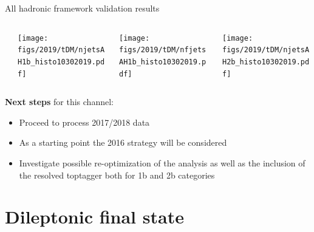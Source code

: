\documentclass[9pt]{beamer}
\begin{document}
\begin{frame}{\alert{All hadronic} framework validation results}
\begin{columns}
\begin{column}{0.05\textwidth}
		\end{column} \hfill
		\begin{column}{0.32\textwidth}
			\begin{center}
     			\texttt{[image: figs/2019/tDM/njetsAH1b\_histo10302019.pdf]}
    		\end{center}		
		\end{column} \hfill
		\begin{column}{0.32\textwidth}
			\begin{center}
     			\texttt{[image: figs/2019/tDM/nfjetsAH1b\_histo10302019.pdf]}
    		\end{center}		
		\end{column} \hfill
		\begin{column}{0.32\textwidth}
			\begin{center}
     			\texttt{[image: figs/2019/tDM/njetsAH2b\_histo10302019.pdf]}
   			 \end{center}
		\end{column} \hfill
	\end{columns} \vfill
	\textbf{Next steps} for this channel:
\begin{itemize}
\item Proceed to process 2017/2018 data
\item As a starting point the 2016 strategy will be considered
\item Investigate possible re-optimization of the analysis as well as the inclusion of the resolved toptagger both for 1b and 2b categories 
\end{itemize} \vfill
\end{frame}

\section{Dileptonic final state}
\end{document}
